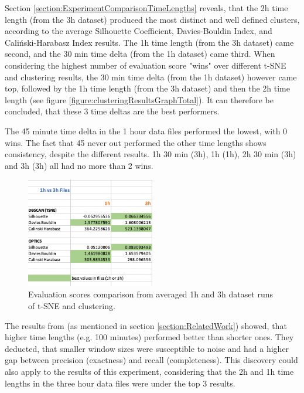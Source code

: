 Section \ref{section:ExperimentComparisonTimeLengths} reveals, that the 2h time length (from the 3h dataset) produced the most distinct and well defined clusters, according to the average Silhouette Coefficient, Davies-Bouldin Index, and Caliński-Harabasz Index results. The 1h time length (from the 3h dataset) came second, and the 30 min time delta (from the 1h dataset) came third. When considering the highest number of evaluation score "wins" over different t-SNE and clustering results, the 30 min time delta (from the 1h dataset) however came top, followed by the 1h time length (from the 3h dataset) and then the 2h time length (see figure \ref{figure:clusteringResultsGraphTotal}). It can therefore be concluded, that these 3 time deltas are the best performers.

The 45 minute time delta in the 1 hour data files performed the lowest, with 0 wins. The fact that 45 never out performed the other time lengths shows consistency, despite the different results. 1h 30 min (3h), 1h (1h), 2h 30 min (3h) and 3h (3h) all had no more than 2 wins. 


\begin{figure}
  \centering
  \includegraphics[width=0.5\textwidth]{./images/clusteringResults/clusteringResults7.png}
  \caption{Evaluation scores comparison from averaged 1h and 3h dataset runs of t-SNE and clustering.}
  \label{figure:clusteringResults7}
\end{figure}


The results from \textcite{AboutToEat2016Rahman} (as mentioned in section \ref{section:RelatedWork}) showed, that higher time lengths (e.g. 100 minutes) performed better than shorter ones. They deducted, that smaller window sizes were susceptible to noise and had a higher gap between precision (exactness) and recall (completeness). This discovery could also apply to the results of this experiment, considering that the 2h and 1h time lengths in the three hour data files were under the top 3 results.


